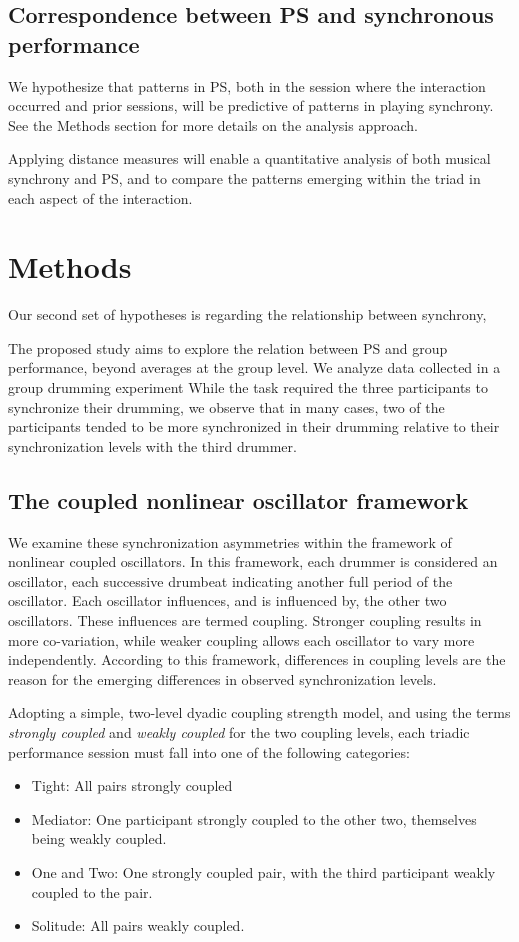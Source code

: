\documentclass[a4paper, 11pt]{report}      %
\begin{document}
\subsection{Correspondence between PS and synchronous performance}

We hypothesize that patterns in PS, both in the session where the interaction occurred and prior sessions, will be predictive of patterns in playing synchrony. See the Methods section for more details on the analysis approach.

Applying distance measures will enable a quantitative analysis of both musical synchrony and PS, and to compare the patterns emerging within the triad in each aspect of the interaction.

\section{Methods}
Our second set of hypotheses is regarding the relationship between 
synchrony,



The proposed study aims to explore the relation between PS and group performance, beyond averages at the group level. We analyze data collected in a group drumming experiment 
While the task required the three participants to synchronize their drumming, we observe that in many cases, two of the participants tended to be more synchronized in their drumming relative to their synchronization levels with the third drummer.

\subsection{The coupled nonlinear oscillator framework}
We examine these synchronization asymmetries within the framework of nonlinear coupled oscillators. In this framework, each drummer is considered an oscillator, each successive drumbeat indicating another full period of the oscillator. Each oscillator influences, and is influenced by, the other two oscillators. These influences are termed coupling. Stronger coupling results in more co-variation, while weaker coupling allows each oscillator to vary more independently. According to this framework, differences in coupling levels are the reason for the emerging differences in observed synchronization levels. 

Adopting a simple, two-level dyadic coupling strength model, and using the terms \emph{strongly coupled} and \emph{weakly coupled} for the two coupling levels, each triadic performance session must fall into one of the following categories:
\begin{itemize}
    \item Tight: All pairs strongly coupled
    \item Mediator: One participant strongly coupled to the other two, themselves being weakly coupled.
    \item One and Two: One strongly coupled pair, with the third participant weakly coupled to the pair.
    \item Solitude: All pairs weakly coupled.
\end{itemize}
\end{document}
